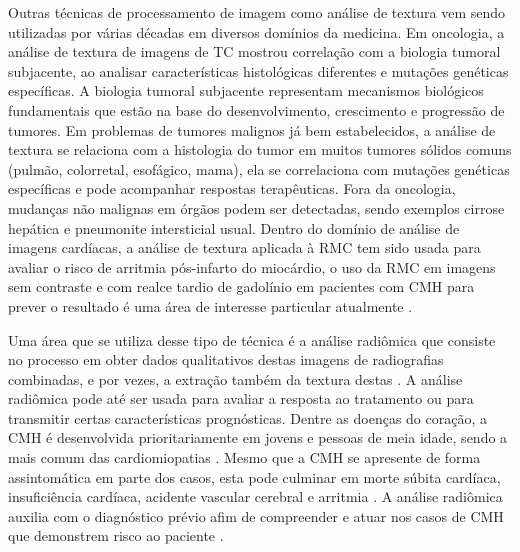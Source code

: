 Outras técnicas de processamento de imagem como análise de textura vem sendo utilizadas por várias décadas em diversos domínios da medicina. Em oncologia, a análise de textura de imagens de \gls{TC} mostrou correlação com a biologia tumoral subjacente, ao analisar características histológicas diferentes e mutações genéticas específicas. A biologia tumoral subjacente representam mecanismos biológicos fundamentais que estão na base do desenvolvimento, crescimento e progressão de tumores. Em problemas de tumores malignos já bem estabelecidos, a análise de textura se relaciona com a histologia do tumor em muitos tumores sólidos comuns (pulmão, colorretal, esofágico, mama), ela se correlaciona com mutações genéticas específicas e pode acompanhar respostas terapêuticas. Fora da oncologia, mudanças não malignas em órgãos podem ser detectadas, sendo exemplos cirrose hepática e pneumonite intersticial usual. Dentro do domínio de análise de imagens cardíacas, a análise de textura aplicada à \gls{RMC} tem sido usada para avaliar o risco de arritmia pós-infarto do miocárdio, o uso da RMC em imagens sem contraste e com realce tardio de gadolínio em pacientes com \gls{CMH} para prever o resultado é uma área de interesse particular atualmente \cite{schofieldTextureAnalysisCardiovascular2019a}.





Uma área que se utiliza desse tipo de técnica é a análise radiômica que consiste no processo em obter dados qualitativos destas imagens de radiografias combinadas, e por vezes, a extração também da textura destas \cite{lambinRadiomicsExtractingMore2012}. A análise radiômica pode até ser usada para avaliar a resposta ao tratamento ou para transmitir certas características prognósticas. Dentre as doenças do coração, a \gls{CMH} é desenvolvida prioritariamente em jovens e pessoas de meia idade, sendo a mais comum das cardiomiopatias . Mesmo que a \gls{CMH} se apresente de forma assintomática em parte dos casos, esta pode culminar em morte súbita cardíaca, insuficiência cardíaca, acidente vascular cerebral e arritmia . A análise radiômica auxilia com o diagnóstico prévio afim de compreender e atuar nos casos de \gls{CMH} que demonstrem risco ao paciente \cite{kwonComparisonMortalityCause2022}.

